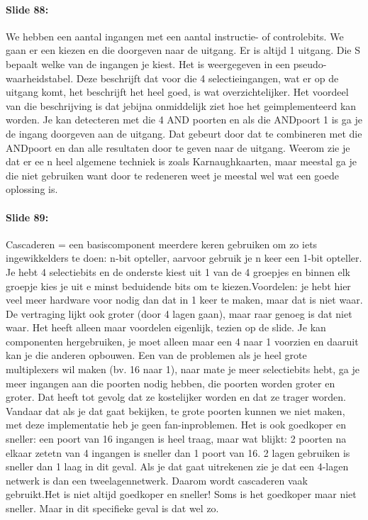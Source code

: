 \documentclass[10pt,a4paper]{book}
\begin{document}
\paragraph{Slide 88:} We hebben een aantal ingangen met een aantal instructie- of controlebits. We gaan er een kiezen en die doorgeven naar de uitgang. Er is altijd 1 uitgang. Die S bepaalt welke van de ingangen je kiest. Het is weergegeven in een pseudo-waarheidstabel. Deze beschrijft dat voor die 4 selectieingangen, wat er op de uitgang komt, het beschrijft het heel goed, is wat overzichtelijker. Het voordeel van die beschrijving is dat jebijna onmiddelijk ziet hoe het geimplementeerd kan worden. Je kan detecteren met die 4 AND poorten en als die ANDpoort 1 is ga je de ingang doorgeven aan de uitgang. Dat gebeurt door dat te combineren met die ANDpoort en dan alle resultaten door te geven naar de uitgang. Weerom zie je dat er ee n heel algemene techniek is zoals Karnaughkaarten, maar meestal ga je die niet gebruiken want door te redeneren weet je meestal wel wat een goede oplossing is.

\paragraph{Slide 89:} Cascaderen = een basiscomponent meerdere keren gebruiken om zo iets ingewikkelders te doen: n-bit opteller, aarvoor gebruik je n keer een 1-bit opteller. Je hebt 4 selectiebits en de onderste kiest uit 1 van de 4 groepjes en binnen elk groepje kies je uit e minst beduidende bits om te kiezen.Voordelen: je hebt hier veel meer hardware voor nodig dan dat in 1 keer te maken, maar dat is niet waar. De vertraging lijkt ook groter (door 4 lagen gaan), maar raar genoeg is dat niet waar. Het heeft alleen maar voordelen eigenlijk, tezien op de slide. Je kan componenten hergebruiken, je moet alleen maar een 4 naar 1 voorzien en daaruit kan je die anderen opbouwen. Een van de problemen als je heel grote multiplexers wil maken (bv. 16 naar 1), naar mate je meer selectiebits hebt, ga je meer ingangen aan die poorten nodig hebben, die poorten worden groter en groter. Dat heeft tot gevolg dat ze kostelijker worden en dat ze trager worden. Vandaar dat als je dat gaat bekijken, te grote poorten kunnen we niet maken, met deze implementatie heb je geen fan-inproblemen. Het is ook goedkoper en sneller: een poort van 16 ingangen is heel traag, maar wat blijkt: 2 poorten na elkaar zetetn van 4 ingangen is sneller dan 1 poort van 16. 2 lagen gebruiken is sneller dan 1 laag in dit geval. Als je dat gaat uitrekenen zie je dat een 4-lagen netwerk is dan een tweelagennetwerk. Daarom wordt cascaderen vaak gebruikt.Het is niet altijd goedkoper en sneller! Soms is het goedkoper maar niet sneller. Maar in dit specifieke geval is dat wel zo.
\end{document}
